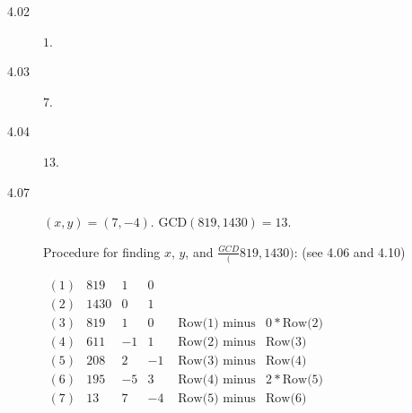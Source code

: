 \documentclass{article}
\begin{document}
\begin{description}
  \item[4.02] $1$.
  \item[4.03] $7$.
  \item[4.04] $13$.
  \item[4.07] $(x,y) = (7,-4)$. $\text{GCD}(819,1430) = 13$.

    Procedure for finding $x$, $y$, and $\frac{GCD}(819, 1430)$: (see 4.06 and 4.10)

    $\begin{array}{crrr|rl}
      (1) &  819 &  1 &  0 & & \\
      (2) & 1430 &  0 &  1 & & \\
      (3) &  819 &  1 &  0 & \text{ Row(1) minus} & 0*\text{Row(2)} \\
      (4) &  611 & -1 &  1 & \text{ Row(2) minus} & \text{Row(3)} \\
      (5) &  208 &  2 & -1 & \text{ Row(3) minus} & \text{Row(4)} \\
      (6) &  195 & -5 &  3 & \text{ Row(4) minus} & 2*\text{Row(5)} \\
      (7) &   13 &  7 & -4 & \text{ Row(5) minus} & \text{Row(6)} \\
    \end{array}$


\end{description}
\end{document}
